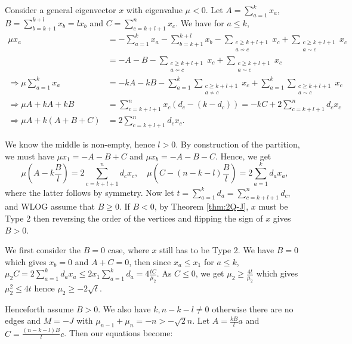 \documentclass[11pt]{article}
\begin{document}
Consider a general eigenvector $x$ with eigenvalue $\mu < 0$. Let $A = \sum_{a = 1}^k x_a$, $B = \sum_{b = k+1}^{k+l} x_b = lx_b$ and $C = \sum_{c = k+l+1}^n x_c$. We have for $a \le k$,
\begin{align*}
    \mu x_a &= - \sum_{a = 1}^k x_a - \sum_{b = k+1}^{k+l} x_b - \sum_{\substack{c \ge k+l+1 \\ a \not \sim c}} x_c + \sum_{\substack{c \ge k+l+1 \\ a \sim c}} x_c \\
    &= -A - B- \sum_{\substack{c \ge k+l+1 \\ a \not \sim c}} x_c + \sum_{\substack{c \ge k+l+1 \\ a \sim c}} x_c \\
    \Rightarrow \mu \sum_{a = 1}^k x_a &= -kA - kB - \sum_{a = 1}^k \sum_{\substack{c \ge k+l+1 \\ a \not \sim c}} x_c + \sum_{a = 1}^k \sum_{\substack{c \ge k+l+1 \\ a \sim c}} x_c \\
    \Rightarrow \mu A + kA + kB &= \sum_{c = k+l+1}^n x_c(d_c - (k-d_c)) = -kC + 2\sum_{c = k+l+1}^n d_cx_c \\
    \Rightarrow \mu A + k(A+B+C) &= 2 \sum_{c = k+l+1}^n d_cx_c.
\end{align*}

We know the middle is non-empty, hence $l > 0$. By construction of the partition, we must have $\mu x_1 = - A - B + C$ and $\mu x_b = - A - B - C$. Hence, we get
\[\mu \left(A - k \frac{B}{l}\right) = 2 \sum_{c = k+l+1}^n d_cx_c, \quad \mu \left(C - (n-k-l) \frac{B}{l}\right) = 2\sum_{a = 1}^k d_ax_a,\]
where the latter follows by symmetry. Now let $t = \sum_{a = 1}^k d_a = \sum_{c = k+l+1}^n d_c$, and WLOG assume that $B \ge 0$. If $B < 0$, by Theorem \ref{thm:2Q-J}, $x$ must be Type 2 then reversing the order of the vertices and flipping the sign of $x$ gives $B > 0$. 

We first consider the $B = 0$ case, where $x$ still has to be Type 2. We have $B = 0$ which gives $x_b = 0$ and $A + C = 0$, then since $x_a \le x_1$ for $a \le k$, $\mu_2 C = 2\sum_{a = 1}^k d_a x_a \le 2x_1 \sum_{a=1}^k d_a = 4\frac{tC}{\mu_2}$. As $C \le 0$, we get $\mu_2 \ge \frac{4t}{\mu_2}$ which gives $\mu_2^2 \le 4t$ hence $\mu_2 \ge -2\sqrt{t}$. 

Henceforth assume $B > 0$. We also have $k, n-k-l \neq 0$ otherwise there are no edges and $M = -J$ with $\mu_{n-1} + \mu_n = -n > -\sqrt{2}n$. Let $A = \frac{kB}{l}a$ and $C = \frac{(n-k-l)B}{l}c$. Then our equations become:
\end{document}
